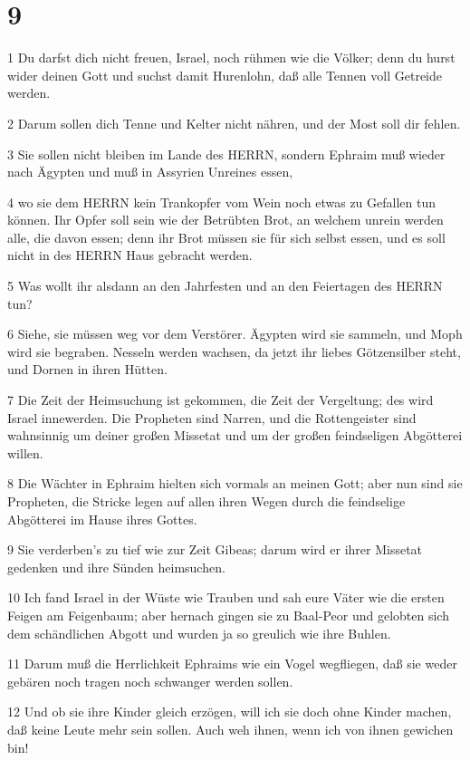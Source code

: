 \chapter{9}

\par 1 Du darfst dich nicht freuen, Israel, noch rühmen wie die Völker; denn du hurst wider deinen Gott und suchst damit Hurenlohn, daß alle Tennen voll Getreide werden.
\par 2 Darum sollen dich Tenne und Kelter nicht nähren, und der Most soll dir fehlen.
\par 3 Sie sollen nicht bleiben im Lande des HERRN, sondern Ephraim muß wieder nach Ägypten und muß in Assyrien Unreines essen,
\par 4 wo sie dem HERRN kein Trankopfer vom Wein noch etwas zu Gefallen tun können. Ihr Opfer soll sein wie der Betrübten Brot, an welchem unrein werden alle, die davon essen; denn ihr Brot müssen sie für sich selbst essen, und es soll nicht in des HERRN Haus gebracht werden.
\par 5 Was wollt ihr alsdann an den Jahrfesten und an den Feiertagen des HERRN tun?
\par 6 Siehe, sie müssen weg vor dem Verstörer. Ägypten wird sie sammeln, und Moph wird sie begraben. Nesseln werden wachsen, da jetzt ihr liebes Götzensilber steht, und Dornen in ihren Hütten.
\par 7 Die Zeit der Heimsuchung ist gekommen, die Zeit der Vergeltung; des wird Israel innewerden. Die Propheten sind Narren, und die Rottengeister sind wahnsinnig um deiner großen Missetat und um der großen feindseligen Abgötterei willen.
\par 8 Die Wächter in Ephraim hielten sich vormals an meinen Gott; aber nun sind sie Propheten, die Stricke legen auf allen ihren Wegen durch die feindselige Abgötterei im Hause ihres Gottes.
\par 9 Sie verderben's zu tief wie zur Zeit Gibeas; darum wird er ihrer Missetat gedenken und ihre Sünden heimsuchen.
\par 10 Ich fand Israel in der Wüste wie Trauben und sah eure Väter wie die ersten Feigen am Feigenbaum; aber hernach gingen sie zu Baal-Peor und gelobten sich dem schändlichen Abgott und wurden ja so greulich wie ihre Buhlen.
\par 11 Darum muß die Herrlichkeit Ephraims wie ein Vogel wegfliegen, daß sie weder gebären noch tragen noch schwanger werden sollen.
\par 12 Und ob sie ihre Kinder gleich erzögen, will ich sie doch ohne Kinder machen, daß keine Leute mehr sein sollen. Auch weh ihnen, wenn ich von ihnen gewichen bin!
